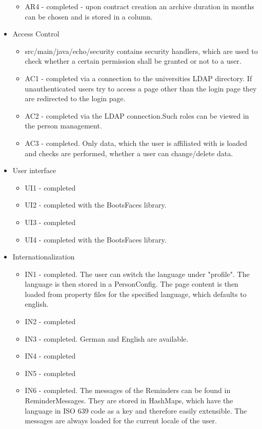 \documentclass{article}
\begin{document}
\begin{itemize}
\begin{itemize}
\item AR4 - completed - upon contract creation an archive duration in months can be chosen and is stored in a column.
\end{itemize}
\item Access Control
\begin{itemize}
\item src/main/java/echo/security contains security handlers, which are used to check whether a certain permission shall be granted or not to a user.
\item AC1 - completed via a connection to the universities LDAP directory. If unauthenticated users try to access a page other than the login page they are redirected to the login page.
\item AC2 - completed via the LDAP connection.Such roles can be viewed in the person management.
\item AC3 - completed. Only data, which the user is affiliated with is loaded and checks are performed, whether a user can change/delete data. 
\end{itemize}
\item User interface
\begin{itemize}
\item UI1 - completed
\item UI2 - completed with the BootsFaces library.
\item UI3 - completed
\item UI4 - completed with the BootsFaces library.
\end{itemize}
\item Internationalization
\begin{itemize}
\item IN1 - completed. The user can switch the language under "profile". The language is then stored in a PersonConfig. The page content is then loaded from property files for the specified language, which defaults to english.
\item IN2 - completed
\item IN3 - completed. German and English are available.
\item IN4 - completed
\item IN5 - completed
\item IN6 - completed. The messages of the Reminders can be found in ReminderMessages. They are stored in HashMaps, which have the language in ISO 639 code as a key and therefore easily extensible. The messages are always loaded for the current locale of the user.
\end{itemize}

\end{itemize}
\end{document}
